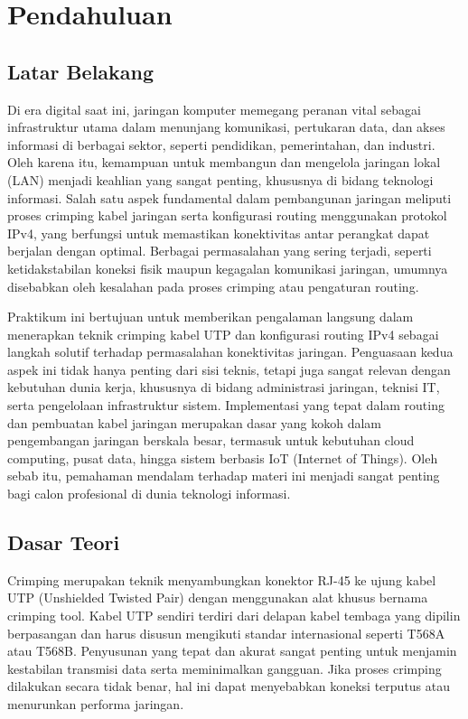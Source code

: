 \section{Pendahuluan}
\subsection{Latar Belakang}

Di era digital saat ini, jaringan komputer memegang peranan vital sebagai infrastruktur utama dalam menunjang komunikasi, pertukaran data, dan akses informasi di berbagai sektor, seperti pendidikan, pemerintahan, dan industri. Oleh karena itu, kemampuan untuk membangun dan mengelola jaringan lokal (LAN) menjadi keahlian yang sangat penting, khususnya di bidang teknologi informasi. Salah satu aspek fundamental dalam pembangunan jaringan meliputi proses crimping kabel jaringan serta konfigurasi routing menggunakan protokol IPv4, yang berfungsi untuk memastikan konektivitas antar perangkat dapat berjalan dengan optimal. Berbagai permasalahan yang sering terjadi, seperti ketidakstabilan koneksi fisik maupun kegagalan komunikasi jaringan, umumnya disebabkan oleh kesalahan pada proses crimping atau pengaturan routing.

Praktikum ini bertujuan untuk memberikan pengalaman langsung dalam menerapkan teknik crimping kabel UTP dan konfigurasi routing IPv4 sebagai langkah solutif terhadap permasalahan konektivitas jaringan. Penguasaan kedua aspek ini tidak hanya penting dari sisi teknis, tetapi juga sangat relevan dengan kebutuhan dunia kerja, khususnya di bidang administrasi jaringan, teknisi IT, serta pengelolaan infrastruktur sistem. Implementasi yang tepat dalam routing dan pembuatan kabel jaringan merupakan dasar yang kokoh dalam pengembangan jaringan berskala besar, termasuk untuk kebutuhan cloud computing, pusat data, hingga sistem berbasis IoT (Internet of Things). Oleh sebab itu, pemahaman mendalam terhadap materi ini menjadi sangat penting bagi calon profesional di dunia teknologi informasi.

\subsection{Dasar Teori}
Crimping merupakan teknik menyambungkan konektor RJ-45 ke ujung kabel UTP (Unshielded Twisted Pair) dengan menggunakan alat khusus bernama crimping tool. Kabel UTP sendiri terdiri dari delapan kabel tembaga yang dipilin berpasangan dan harus disusun mengikuti standar internasional seperti T568A atau T568B. Penyusunan yang tepat dan akurat sangat penting untuk menjamin kestabilan transmisi data serta meminimalkan gangguan. Jika proses crimping dilakukan secara tidak benar, hal ini dapat menyebabkan koneksi terputus atau menurunkan performa jaringan.

